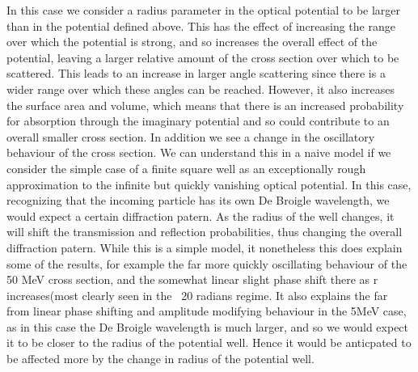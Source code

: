 \documentclass[paper=a4, fontsize=11pt]{scrartcl} %
\numberwithin{equation}{section} %
\numberwithin{figure}{section} %
\numberwithin{table}{section} %
\begin{document}
In this case we consider a radius parameter in the optical potential to be larger than in the potential defined above. This has the effect of increasing the range over which the potential is strong, and so increases the overall effect of the potential, leaving a larger relative amount of the cross section over which to be scattered. This leads to an increase in larger angle scattering since there is a wider range over which these angles can be reached. However, it also increases the surface area and volume, which means that there is an increased probability for absorption through the imaginary potential and so could contribute to an overall smaller cross section. In addition we see a change in the oscillatory behaviour of the cross section. We can understand this in a naive model if we consider the simple case of a finite square well as an exceptionally rough approximation to the infinite but quickly vanishing optical potential. In this case, recognizing that the incoming particle has its own De Broigle wavelength, we would expect a certain diffraction patern. As the radius of the well changes, it will shift the transmission and reflection probabilities, thus changing the overall diffraction patern. While this is a simple model, it nonetheless this does explain some of the results, for example the far more quickly oscillating behaviour of the 50 MeV cross section, and the somewhat linear slight phase shift there as r increases(most clearly seen in  the ~20 radians regime. It also explains the far from linear phase shifting and amplitude modifying behaviour in the 5MeV case, as in this case the De Broigle wavelength is much larger, and so we would expect it to be closer to the radius of the potential well. Hence it  would be anticpated to be affected more by the change in radius of the potential well. 
\end{document}
